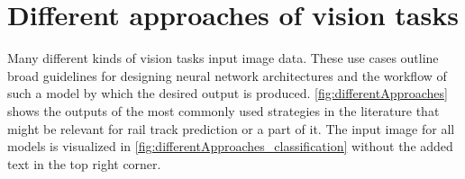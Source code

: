 \section{Different approaches of vision tasks}
\label{sec:differentApproaches}

Many different kinds of vision tasks input image data.
These use cases outline broad guidelines for designing neural network architectures and the workflow of such a model by which the desired output is produced.
\autoref{fig:differentApproaches} shows the outputs of the most commonly used strategies in the literature that might be relevant for rail track prediction or a part of it.
The input image for all models is visualized in \autoref{fig:differentApproaches_classification} without the added text in the top right corner.

\vspace{1cm} %

